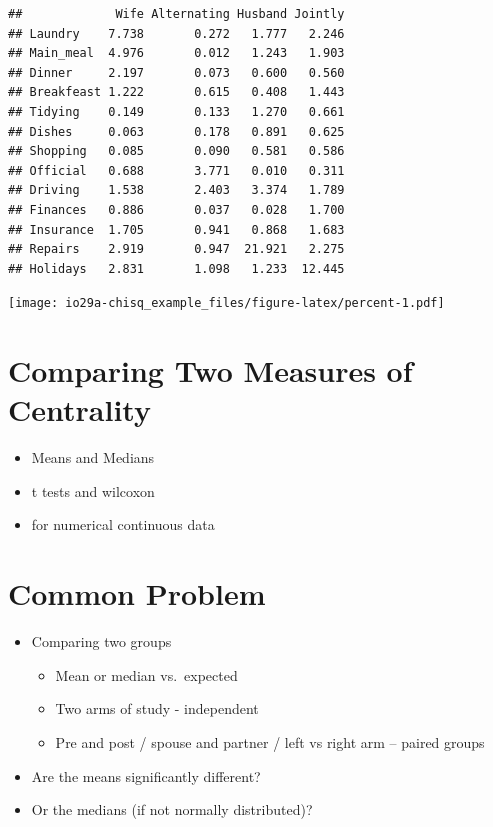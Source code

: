 \documentclass[
]{book}
\providecommand{\tightlist}{%
  \setlength{\itemsep}{0pt}\setlength{\parskip}{0pt}}
\begin{document}
\begin{verbatim}
##             Wife Alternating Husband Jointly
## Laundry    7.738       0.272   1.777   2.246
## Main_meal  4.976       0.012   1.243   1.903
## Dinner     2.197       0.073   0.600   0.560
## Breakfeast 1.222       0.615   0.408   1.443
## Tidying    0.149       0.133   1.270   0.661
## Dishes     0.063       0.178   0.891   0.625
## Shopping   0.085       0.090   0.581   0.586
## Official   0.688       3.771   0.010   0.311
## Driving    1.538       2.403   3.374   1.789
## Finances   0.886       0.037   0.028   1.700
## Insurance  1.705       0.941   0.868   1.683
## Repairs    2.919       0.947  21.921   2.275
## Holidays   2.831       1.098   1.233  12.445
\end{verbatim}

\texttt{[image: io29a-chisq\_example\_files/figure-latex/percent-1.pdf]}

\hypertarget{comparing-two-measures-of-centrality}{%
\section{Comparing Two Measures of Centrality}\label{comparing-two-measures-of-centrality}}

\begin{itemize}
\tightlist
\item
  Means and Medians
\item
  t tests and wilcoxon
\item
  for numerical continuous data
\end{itemize}

\hypertarget{common-problem}{%
\section{Common Problem}\label{common-problem}}

\begin{itemize}
\tightlist
\item
  Comparing two groups

  \begin{itemize}
  \tightlist
  \item
    Mean or median vs.~expected
  \item
    Two arms of study - independent
  \item
    Pre and post / spouse and partner / left vs right arm -- paired groups
  \end{itemize}
\item
  Are the means significantly different?
\item
  Or the medians (if not normally distributed)?
\end{itemize}
\end{document}
